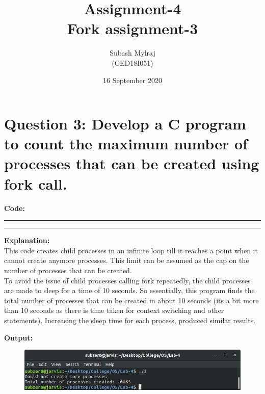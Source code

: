 \documentclass{article}
\title{Assignment-4\\Fork assignment-3}
\author{Subash Mylraj \\(CED18I051) }
\date{16 September 2020}
\begin{document}
\maketitle



\section*{Question 3: Develop a C program to count the maximum number of processes that can be created using fork call.}
\bigskip

\textbf{\Large Code:}
\smallskip
\par\noindent\rule{\textwidth}{0.4pt}

\par\noindent\rule{\textwidth}{0.4pt}

\bigskip
\noindent
\textbf{\Large Explanation: } \\

	This code creates child processes in an infinite loop till 
	it reaches a point when it cannot create anymore processes.
	This limit can be assumed as the cap on the number of processes
	that can be created. \\

	To avoid the issue of child processes calling fork repeatedly,
	the child processes are made to sleep for a time of 10 seconds.
	So essentially, this program finds the total number of processes
	that can be created in about 10 seconds (its a bit more than 10
	seconds as there is time taken for context switching and other 
	statements). Increasing the sleep time for each process, produced
	similar results.


\pagebreak
\bigskip
\noindent
\textbf{\Large Output:}

\begin{figure}[h]
	\includegraphics[width=\textwidth]{output/3.png}
\end{figure}
\bigskip
\bigskip
\bigskip
\end{document}
